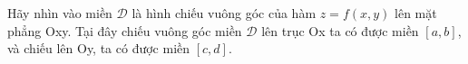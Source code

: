 \documentclass[preview]{standalone}
\begin{document}
\parbox{8cm}{Hãy nhìn vào miền $\mathcal{D}$ là hình chiếu vuông góc của hàm $z = f(x, y)$ lên mặt phẳng Oxy. Tại đây chiếu vuông góc miền $\mathcal{D}$ lên trục Ox ta có được miền $[a, b]$, và chiếu lên Oy, ta có được miền $[c, d]$.}
\end{document}
